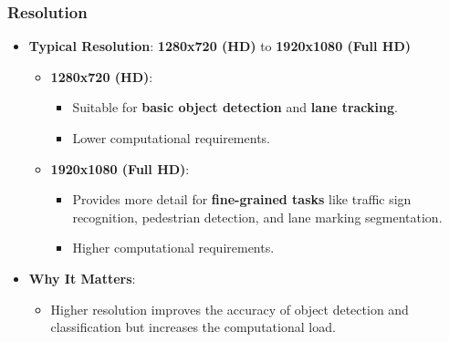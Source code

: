 \subsubsection{Resolution}
\begin{itemize}
    \item \textbf{Typical Resolution}: \textbf{1280x720 (HD)} to \textbf{1920x1080 (Full HD)}
    \begin{itemize}
        \item \textbf{1280x720 (HD)}:
        \begin{itemize}
            \item Suitable for \textbf{basic object detection} and \textbf{lane tracking}.
            \item Lower computational requirements.
        \end{itemize}
        \item \textbf{1920x1080 (Full HD)}:
        \begin{itemize}
            \item Provides more detail for \textbf{fine-grained tasks} like traffic sign recognition, pedestrian detection, and lane marking segmentation.
            \item Higher computational requirements.
        \end{itemize}
    \end{itemize}
    \item \textbf{Why It Matters}:
    \begin{itemize}
        \item Higher resolution improves the accuracy of object detection and classification but increases the computational load.
    \end{itemize}
\end{itemize}


